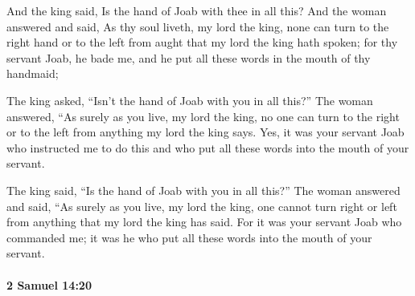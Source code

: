 			\begin{versebox}
					\item[BHS] 
					\item[ASV] And the king said, Is the hand of Joab with thee in all this? And the woman answered and said, As thy soul liveth, my lord the king, none can turn to the right hand or to the left from aught that my lord the king hath spoken; for thy servant Joab, he bade me, and he put all these words in the mouth of thy handmaid;
					\item[NIV] The king asked, “Isn’t the hand of Joab with you in all this?” The woman answered, “As surely as you live, my lord the king, no one can turn to the right or to the left from anything my lord the king says. Yes, it was your servant Joab who instructed me to do this and who put all these words into the mouth of your servant.
					\item[NRSV] The king said, “Is the hand of Joab with you in all this?” The woman answered and said, “As surely as you live, my lord the king, one cannot turn right or left from anything that my lord the king has said. For it was your servant Joab who commanded me; it was he who put all these words into the mouth of your servant.
			\end{versebox}

		\paragraph{2 Samuel 14:20} %
			\label{2SAMUEL-14-20}

